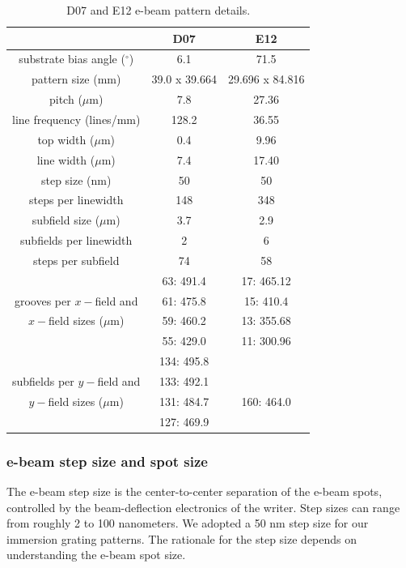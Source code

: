 \begin{table}
	\begin{center}
	\caption{D07 and E12 e-beam pattern details. \label{tab:D07andE12}}
	\begin{tabular}{ccc}
	\toprule
	   &D07 & E12  \\
	\midrule
	substrate bias angle ($^\circ$) & 6.1 & 71.5 \\
	pattern size (mm) & 39.0 x 39.664 & 29.696 x 84.816 \\
	pitch ($\mu$m) & 7.8 & 27.36 \\
	line frequency (lines/mm) & 128.2 & 36.55 \\
	top width ($\mu$m) & 0.4 & 9.96 \\
	line width ($\mu$m) & 7.4 & 17.40 \\
	step size (nm) & 50 & 50 \\
	steps per linewidth & 148 & 348 \\
	subfield size ($\mu$m) & 3.7 & 2.9 \\
	subfields per linewidth & 2 & 6 \\
	steps per subfield & 74 & 58 \\
	\cline{1-1}
	 			      & 63: 491.4  & 17: 465.12 \\
	grooves per $x-$field and & 61: 475.8 & 15: 410.4 \\
	$x-$field sizes ($\mu$m) & 59: 460.2 & 13: 355.68 \\
	 				        & 55: 429.0 & 11: 300.96 \\
	\cline{1-1}					        
	 			      & 134: 495.8  &   \\
	subfields per $y-$field and & 133: 492.1 &   \\
	$y-$field sizes ($\mu$m) & 131: 484.7 & 160: 464.0 \\
	 				        & 127: 469.9 &   \\	
	\cline{1-1}
	\bottomrule
	\end{tabular}
	\end{center}
\end{table}	


\subsubsection{e-beam step size and spot size}
The e-beam step size is the center-to-center separation of the e-beam spots, controlled by the beam-deflection electronics of the writer.  Step sizes can range from roughly 2 to 100 nanometers.  We adopted a 50 nm step size for our immersion grating patterns.  The rationale for the step size depends on understanding the e-beam spot size.  

